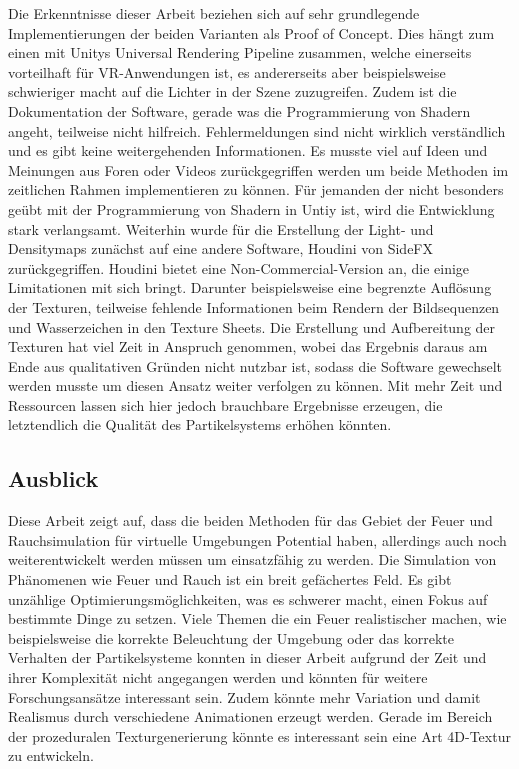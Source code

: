 Die Erkenntnisse dieser Arbeit beziehen sich auf sehr grundlegende Implementierungen der beiden Varianten als Proof of Concept. Dies hängt zum einen mit 
Unitys Universal Rendering Pipeline zusammen, welche einerseits vorteilhaft für VR-Anwendungen ist, es andererseits aber beispielsweise schwieriger macht
auf die Lichter in der Szene zuzugreifen. Zudem ist die Dokumentation der Software, gerade was die Programmierung von Shadern angeht, teilweise nicht hilfreich.
Fehlermeldungen sind nicht wirklich verständlich und es gibt keine weitergehenden Informationen.
Es musste viel auf Ideen und Meinungen aus Foren oder Videos zurückgegriffen werden um beide Methoden im zeitlichen Rahmen implementieren zu können.
Für jemanden der nicht besonders geübt mit der Programmierung von Shadern in Untiy ist, wird die Entwicklung stark verlangsamt. 
Weiterhin wurde für die Erstellung der Light- und Densitymaps zunächst auf eine andere Software, Houdini von SideFX zurückgegriffen.
Houdini bietet eine Non-Commercial-Version an, die einige Limitationen mit sich bringt. Darunter beispielsweise eine begrenzte Auflösung der Texturen, 
teilweise fehlende Informationen beim Rendern der Bildsequenzen und Wasserzeichen in den Texture Sheets. Die Erstellung und Aufbereitung der Texturen hat viel Zeit
in Anspruch genommen, wobei das Ergebnis daraus am Ende aus qualitativen Gründen nicht nutzbar ist, sodass die Software gewechselt werden musste um diesen Ansatz 
weiter verfolgen zu können. Mit mehr Zeit und Ressourcen lassen sich hier jedoch brauchbare Ergebnisse erzeugen, die letztendlich die Qualität des 
Partikelsystems erhöhen könnten. 



\subsection{Ausblick}
\label{sec:6.3}
Diese Arbeit zeigt auf, dass die beiden Methoden für das Gebiet der Feuer und Rauchsimulation für virtuelle Umgebungen Potential haben, allerdings auch noch 
weiterentwickelt werden müssen um einsatzfähig zu werden.   
Die Simulation von Phänomenen wie Feuer und Rauch ist ein breit gefächertes Feld. Es gibt unzählige Optimierungsmöglichkeiten, was es schwerer macht, einen Fokus auf
bestimmte Dinge zu setzen. Viele Themen die ein Feuer realistischer machen, wie beispielsweise die korrekte Beleuchtung der Umgebung oder das korrekte Verhalten 
der Partikelsysteme konnten in dieser Arbeit aufgrund der Zeit und ihrer Komplexität nicht angegangen werden und könnten für weitere Forschungsansätze interessant sein. 
Zudem könnte mehr Variation und damit Realismus durch verschiedene Animationen erzeugt werden. Gerade im Bereich der prozeduralen Texturgenerierung könnte es interessant
sein eine Art 4D-Textur zu entwickeln.

\newpage
